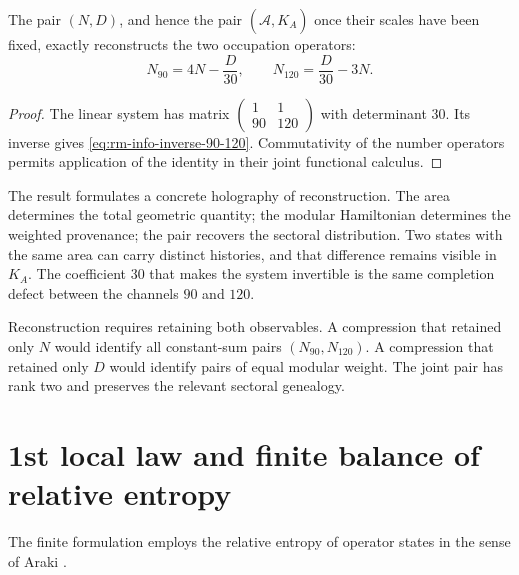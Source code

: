 \begin{theorem}
\label{thm:rm-info-reconstruction-90-120}
The pair \((N,D)\), and hence the pair
\((\widehat{\mathcal A},K_A)\) once their scales have been fixed, exactly reconstructs
the two occupation operators:
\begin{equation}
 \boxed{
 N_{90}=4N-\frac{D}{30},
 \qquad
 N_{120}=\frac{D}{30}-3N.}
 \label{eq:rm-info-inverse-90-120}
\end{equation}
\end{theorem}

\begin{proof}
The linear system has matrix
\(\left(\begin{smallmatrix}1&1\\90&120\end{smallmatrix}\right)\)
with determinant \(30\). Its inverse gives
\cref{eq:rm-info-inverse-90-120}. Commutativity of the number operators permits application of the identity in their joint functional calculus.
\end{proof}

The result formulates a concrete holography of reconstruction. The
area determines the total geometric quantity; the modular Hamiltonian
determines the weighted provenance; the pair recovers the sectoral
distribution. Two states with the same area can carry distinct
histories, and that difference remains visible in \(K_A\). The coefficient
\(30\) that makes the system invertible is the same completion defect
between the channels \(90\) and \(120\).

Reconstruction requires retaining both observables. A compression that
retained only \(N\) would identify all constant-sum pairs
\((N_{90},N_{120})\). A compression that retained only
\(D\) would identify pairs of equal modular weight. The joint pair has
rank two and preserves the relevant sectoral genealogy.

\section{1st local law and finite balance of relative entropy}

The finite formulation employs the relative entropy of operator states
in the sense of Araki \cite{Araki1976}.

